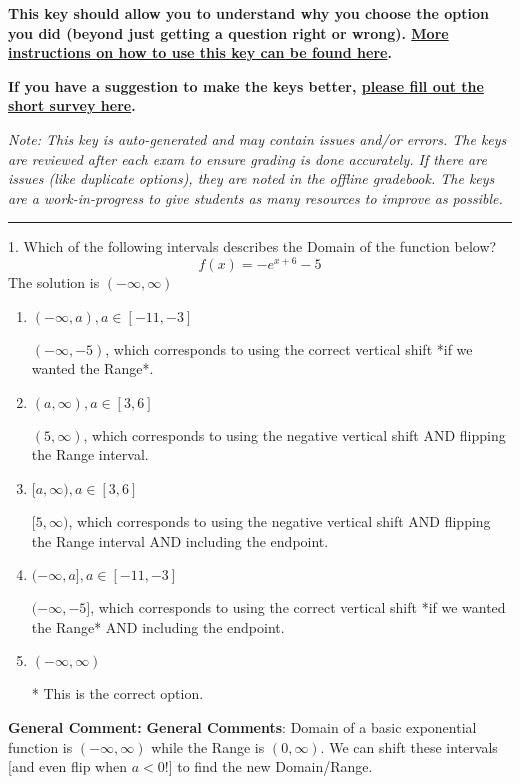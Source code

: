 \documentclass{extbook}[14pt]
\begin{document}
\textbf{This key should allow you to understand why you choose the option you did (beyond just getting a question right or wrong). \href{https://xronos.clas.ufl.edu/mac1105spring2020/courseDescriptionAndMisc/Exams/LearningFromResults}{More instructions on how to use this key can be found here}.}

\textbf{If you have a suggestion to make the keys better, \href{https://forms.gle/CZkbZmPbC9XALEE88}{please fill out the short survey here}.}

\textit{Note: This key is auto-generated and may contain issues and/or errors. The keys are reviewed after each exam to ensure grading is done accurately. If there are issues (like duplicate options), they are noted in the offline gradebook. The keys are a work-in-progress to give students as many resources to improve as possible.}

\rule{\textwidth}{0.4pt}

1. Which of the following intervals describes the Domain of the function below?
\[ f(x) = -e^{x+6}-5 \] 
The solution is $ (-\infty, \infty) $ 

\begin{enumerate}[label=\Alph*.] 
\item $ (-\infty, a), a \in [-11, -3] $ 

 $(-\infty, -5)$, which corresponds to using the correct vertical shift *if we wanted the Range*. 
\item $ (a, \infty), a \in [3, 6] $ 

 $(5, \infty)$, which corresponds to using the negative vertical shift AND flipping the Range interval. 
\item $ [a, \infty), a \in [3, 6] $ 

 $[5, \infty)$, which corresponds to using the negative vertical shift AND flipping the Range interval AND including the endpoint. 
\item $ (-\infty, a], a \in [-11, -3] $ 

 $(-\infty, -5]$, which corresponds to using the correct vertical shift *if we wanted the Range* AND including the endpoint. 
\item $ (-\infty, \infty) $ 

 * This is the correct option. 
\end{enumerate} 
 
\textbf{General Comment:} \textbf{General Comments}: Domain of a basic exponential function is $(-\infty, \infty)$ while the Range is $(0, \infty)$. We can shift these intervals [and even flip when $a<0$!] to find the new Domain/Range. 
\end{document}
